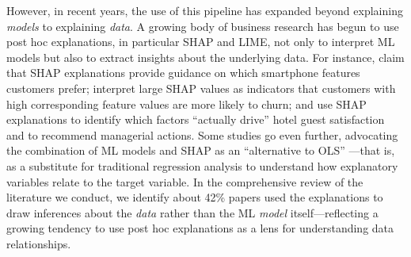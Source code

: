 \documentclass[mnsc,blindrev]{informs3}
\begin{document}
However, in recent years, the use of this pipeline has expanded beyond explaining \textit{models} to explaining \textit{data}. A growing body of business research has begun to use post hoc explanations, in particular SHAP and LIME, not only to interpret ML models but also to extract insights about the underlying data. For instance, \cite{park2024extracting} claim that SHAP explanations provide guidance on which smartphone features customers prefer; \cite{jiang24churn} interpret large SHAP values as indicators that customers with high corresponding feature values are more likely to churn; and \cite{sanchez2023role} use SHAP explanations to identify which factors “actually drive” hotel guest satisfaction and to recommend managerial actions. Some studies go even further, advocating the combination of ML models and SHAP as an “alternative to OLS” \citep{berger2023supply}—that is, as a substitute for traditional regression analysis to understand how explanatory variables relate to the target variable. In the comprehensive review of the literature we conduct, we identify about 42\% papers used the explanations to draw inferences about the \emph{data} rather than the ML \emph{model} itself—reflecting a growing tendency to use post hoc explanations as a lens for understanding data relationships.



\end{document}
